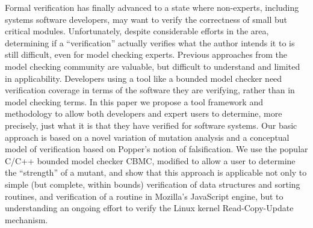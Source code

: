 Formal verification has finally advanced to a state where non-experts, including systems software developers, may want to verify the correctness of small but critical modules.  Unfortunately, despite considerable efforts in the area, determining if a ``verification'' actually verifies what the author intends it to is still difficult, even for model checking experts.  Previous approaches from the model checking community are valuable, but difficult to understand and limited in applicability.  Developers using a tool like a bounded model checker need verification coverage in terms of the software they are verifying, rather than in model checking terms.  In this paper we propose a tool framework and methodology to allow both developers and expert users to determine, more precisely, just what it is that they have verified for software systems.  Our basic approach is based on a novel variation of mutation analysis and a conceptual model of verification based on Popper's notion of falsification.  We use the popular C/C++ bounded model checker CBMC, modified to allow a user to determine the ``strength'' of a mutant, and show that this approach is applicable not only to simple (but complete, within bounds) verification of data structures and sorting routines, and verification of a routine in Mozilla's JavaScript engine, but to understanding an ongoing effort to verify the Linux kernel Read-Copy-Update mechanism.
